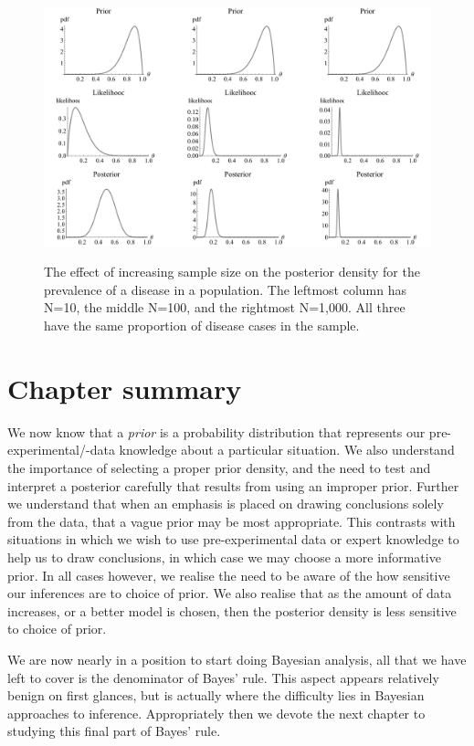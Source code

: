 \documentclass[11pt,fullpage]{book}
\begin{document}
\begin{figure}
\centering
\scalebox{0.40} 
{\includegraphics{Prior_weakPriorEffect.pdf}}\caption{The effect of increasing sample size on the posterior density for the prevalence of a disease in a population. The leftmost column has N=10, the middle N=100, and the rightmost N=1,000. All three have the same proportion of disease cases in the sample.}\label{fig:Prior_weakPriorEffect}
\end{figure}

\section{Chapter summary}
We now know that a \textit{prior} is a probability distribution that represents our pre-experimental/-data knowledge about a particular situation. We also understand the importance of selecting a proper prior density, and the need to test and interpret a posterior carefully that results from using an improper prior. Further we understand that when an emphasis is placed on drawing conclusions solely from the data, that a vague prior may be most appropriate. This contrasts with situations in which we wish to use pre-experimental data or expert knowledge to help us to draw conclusions, in which case we may choose a more informative prior. In all cases however, we realise the need to be aware of the how sensitive our inferences are to choice of prior. We also realise that as the amount of data increases, or a better model is chosen, then the posterior density is less sensitive to choice of prior.

We are now nearly in a position to start doing Bayesian analysis, all that we have left to cover is the denominator of Bayes' rule. This aspect appears relatively benign on first glances, but is actually where the difficulty lies in Bayesian approaches to inference. Appropriately then we devote the next chapter to studying this final part of Bayes' rule.
\end{document}
